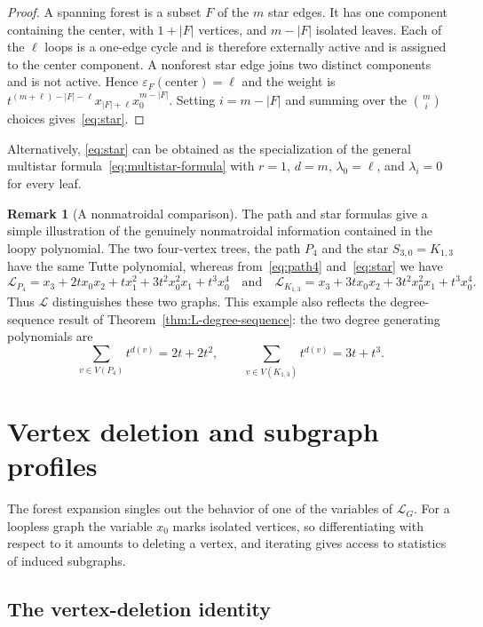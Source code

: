 \documentclass[11pt]{article}
\theoremstyle{plain}
\theoremstyle{definition}
\newtheorem{remark}[theorem]{Remark}
\renewcommand{\mathcal}{\mathscr}
\newcommand{\LL}{\mathcal{L}}    %
\newcommand{\eps}{\varepsilon}
\numberwithin{equation}{section}
\begin{document}
\begin{proof}
A spanning forest is a subset $F$ of the $m$ star edges.  It has one component
containing the center, with $1+|F|$ vertices, and $m-|F|$ isolated leaves.
Each of the $\ell$ loops is a one-edge cycle and is therefore externally
active and is assigned to the center component. A nonforest star edge joins
two distinct components and is not active.  Hence
$\eps_F(\text{center})=\ell$ and the weight is
$t^{(m+\ell)-|F|-\ell}x_{|F|+\ell}x_0^{m-|F|}$.  Setting $i=m-|F|$ and summing
over the $\binom mi$ choices gives~\eqref{eq:star}.
\end{proof}

Alternatively, \eqref{eq:star} can be obtained as the specialization of the
general multistar formula~\eqref{eq:multistar-formula} with $r=1$, $d=m$,
$\lambda_0=\ell$, and $\lambda_i=0$ for every leaf.

\begin{remark}[A nonmatroidal  comparison]\label{rem:nonmatroidal-example}
The path and star formulas give a simple illustration of the genuinely
nonmatroidal information contained in the loopy polynomial.  The two four-vertex trees,
the path $P_4$ and the star $S_{3,0}=K_{1,3}$ have the same Tutte polynomial,
whereas from~\eqref{eq:path4} and~\eqref{eq:star} we have
\[
  \LL_{P_4}=x_3+2t x_0x_2+t x_1^2+3t^2x_0^2x_1+t^3x_0^4 \quad \text{and} \quad \LL_{K_{1,3}}
 =x_3+3t x_0x_2
  +3t^2x_0^2x_1+t^3x_0^4.
\]
Thus $\LL$ distinguishes these two graphs.  This example also reflects the
degree-sequence result of Theorem~\ref{thm:L-degree-sequence}: the two degree
generating polynomials are
\[
 \sum_{v\in V(P_4)} t^{d(v)}=2t+2t^2,
 \qquad
 \sum_{v\in V(K_{1,3})} t^{d(v)}=3t+t^3.
\]
\end{remark}


\section{Vertex deletion and subgraph profiles}\label{sec:vertex-deletion}

The forest expansion singles out the behavior of one of the variables of $\LL_G$.  For a loopless graph the variable $x_0$ marks isolated vertices, so
differentiating with respect to it amounts to deleting a vertex, and iterating gives access to statistics of induced subgraphs.

\subsection{The vertex-deletion identity}\label{subsec:degree-sequence}
\end{document}
